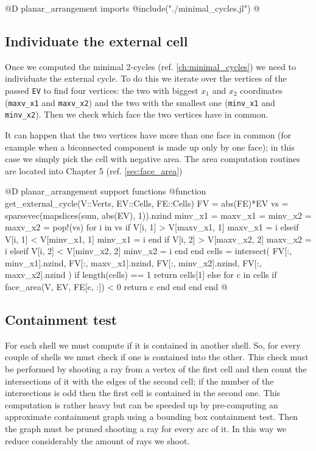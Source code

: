 @D planar\_arrangement imports
@{include("./minimal_cycles.jl")
@}

\subsection{Individuate the external cell}
Once we computed the minimal 2-cycles (ref. \ref{ch:minimal_cycles})
we need to individuate the external cycle. To do this we iterate over the
vertices of the passed \texttt{EV} to find four vertices: the two with biggest
$x_1$ and $x_2$ coordinates (\texttt{maxv\_x1} and \texttt{maxv\_x2}) and the 
two with the smallest one (\texttt{minv\_x1} and \texttt{minv\_x2}). 
Then we check which face the two vertices have in common. 

It can happen that the two vertices have more than one face in common
(for example when a biconnected component is made up only by one face);
in this case we simply pick the cell with negative area. The area
computation routines are located into Chapter 5 (ref. \ref{sec:face_area})


@D planar\_arrangement support functions
@{function get_external_cycle(V::Verts, EV::Cells, FE::Cells)
    FV = abs(FE)*EV
    vs = sparsevec(mapslices(sum, abs(EV), 1)).nzind
    minv_x1 = maxv_x1 = minv_x2 = maxv_x2 = pop!(vs)
    for i in vs
        if V[i, 1] > V[maxv_x1, 1]
            maxv_x1 = i
        elseif V[i, 1] < V[minv_x1, 1]
            minv_x1 = i
        end
        if V[i, 2] > V[maxv_x2, 2]
            maxv_x2 = i
        elseif V[i, 2] < V[minv_x2, 2]
            minv_x2 = i
        end
    end
    cells = intersect(
        FV[:, minv_x1].nzind, 
        FV[:, maxv_x1].nzind,
        FV[:, minv_x2].nzind,
        FV[:, maxv_x2].nzind
    )
    if length(cells) == 1
        return cells[1]
    else
        for c in cells
            if face_area(V, EV, FE[c, :]) < 0
                return c
            end
        end
    end
end
@}

\subsection{Containment test}

For each shell we must compute if it is contained
in another shell. So, for every couple of shells
we must check if one is contained into the other.
This check must be performed by shooting a ray from
a vertex of the first cell and then count the intersections
of it with the edges of the second cell; if the number 
of the intersections is odd then the first cell is contained
in the second one. This computation is rather heavy but can be
speeded up by pre-computing an approximate containment graph 
using a bounding box containment test. Then the graph must be
pruned shooting a ray for every arc of it. In this way we reduce
considerably the amount of rays we shoot.

